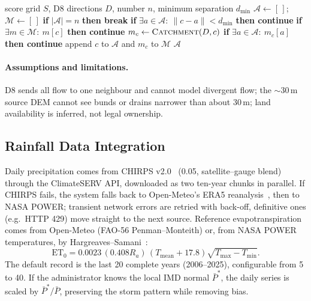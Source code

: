 \documentclass[manuscript,screen,review]{acmart}
\begin{document}
\begin{algorithm}[t]
\caption{Ranking independent candidate sites}\label{alg:rank}
\begin{algorithmic}[1]
\Require score grid $S$, D8 directions $D$, number $n$, minimum separation $d_{\min}$
\State $\mathcal{A}\gets[\,]$; $\mathcal{M}\gets[\,]$ 
  \State \textbf{if} $|\mathcal{A}|=n$ \textbf{then break}
  \State \textbf{if} $\exists a\in\mathcal{A}:\ \lVert c-a\rVert<d_{\min}$ \textbf{then continue} 
  \State \textbf{if} $\exists m\in\mathcal{M}:\ m[c]$ \textbf{then continue} 
  \State $m_c\gets\textsc{Catchment}(D,c)$
  \State \textbf{if} $\exists a\in\mathcal{A}:\ m_c[a]$ \textbf{then continue} 
  \State append $c$ to $\mathcal{A}$ and $m_c$ to $\mathcal{M}$
\EndFor
\State \Return $\mathcal{A}$
\end{algorithmic}
\end{algorithm}

\paragraph{Assumptions and limitations.} D8 sends all flow to one neighbour and cannot model
divergent flow; the $\sim$30\,m source DEM cannot see bunds or drains narrower than about
30\,m; land availability is inferred, not legal ownership.

\subsection{Rainfall Data Integration}
Daily precipitation comes from CHIRPS v2.0~\cite{funk2015} (0.05\textdegree{},
satellite--gauge blend) through the ClimateSERV API, downloaded as two ten-year chunks in
parallel. If CHIRPS fails, the system falls back to Open-Meteo's ERA5
reanalysis~\cite{hersbach2020}, then to NASA POWER; transient network errors are retried with
back-off, definitive ones (e.g.\ HTTP 429) move straight to the next source. Reference
evapotranspiration comes from Open-Meteo (FAO-56 Penman--Monteith) or, from NASA POWER
temperatures, by Hargreaves--Samani~\cite{allen1998}:
\begin{equation}
\mathrm{ET}_0 = 0.0023\,(0.408R_a)\,(T_\text{mean}+17.8)\sqrt{T_\text{max}-T_\text{min}}.
\end{equation}
The default record is the last 20 complete years (2006--2025), configurable from 5 to 40. If
the administrator knows the local IMD normal $\bar P^\ast$, the daily series is scaled by
$\bar P^\ast/\bar P$, preserving the storm pattern while removing bias.
\end{document}
